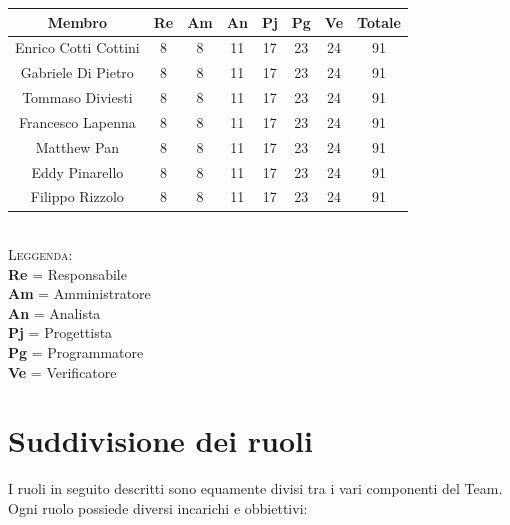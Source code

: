 \documentclass{article}
\begin{document}
\begin{table}[!h]
	\begin{center}
		\begin{tabular}{ |c|c|c|c|c|c|c|c| }
			\hline
			\textbf{Membro}    & \textbf{Re} & \textbf{Am} & \textbf{An} & \textbf{Pj} & \textbf{Pg} & \textbf{Ve} & \textbf{Totale} \\
			\hline
			Enrico Cotti Cottini     & 8           & 8           & 11          & 17          & 23          & 24          & 91              \\
			Gabriele Di Pietro       & 8           & 8           & 11          & 17          & 23          & 24          & 91              \\
			Tommaso Diviesti         & 8           & 8           & 11          & 17          & 23          & 24          & 91              \\
			Francesco Lapenna        & 8           & 8           & 11          & 17          & 23          & 24          & 91              \\
			Matthew Pan              & 8           & 8           & 11          & 17          & 23          & 24          & 91              \\
			Eddy Pinarello           & 8           & 8           & 11          & 17          & 23          & 24          & 91              \\
			Filippo Rizzolo          & 8           & 8           & 11          & 17          & 23          & 24          & 91              \\
			\hline
		\end{tabular}
	\end{center}
\end{table}
\\
\textsc{Leggenda:} \\
    \textbf{Re} = Responsabile \\
    \textbf{Am} = Amministratore \\
    \textbf{An} = Analista \\
    \textbf{Pj} = Progettista \\
    \textbf{Pg} = Programmatore \\
    \textbf{Ve} = Verificatore \\
    
\newpage
\section{Suddivisione dei ruoli}
I ruoli in seguito descritti sono equamente divisi tra i vari componenti del Team. Ogni ruolo possiede diversi incarichi e obbiettivi:
\end{document}
